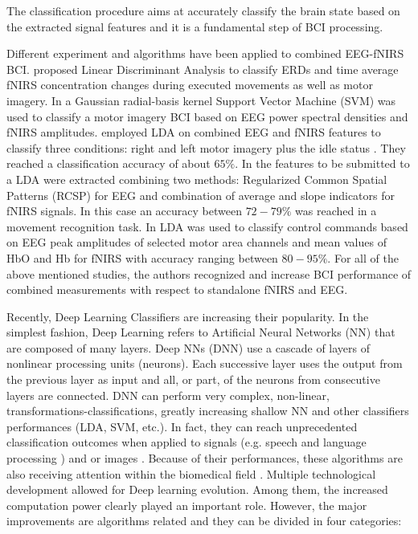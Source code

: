 \documentclass[12pt ]{iopart}
\begin{document}
The classification procedure aims at accurately classify the brain state  based on the extracted signal features  and it is a fundamental step of BCI processing.


Different  experiment and algorithms have been applied  to combined EEG-fNIRS BCI.  \textcite{Fazli_2012} proposed Linear Discriminant Analysis to classify ERDs and time average fNIRS concentration changes during executed movements as well as motor imagery.  In \textcite{ma2012hybrid} a Gaussian radial-basis kernel Support Vector Machine (SVM) was used to classify a motor imagery BCI based on EEG power spectral densities and fNIRS amplitudes.   \textcite{lee2014hybrid} employed LDA on combined EEG and fNIRS features to classify three conditions: right and left motor imagery plus the idle status . They reached a classification accuracy of about $65\%$. In \textcite{buccino2016hybrid} the features to be submitted to a LDA were extracted combining two methods: Regularized Common Spatial Patterns (RCSP) for EEG and combination of average and slope indicators for fNIRS signals. In this case an accuracy between $72-79\%$ was reached in a movement recognition task. In  \textcite{khan2014decoding, khan2017hybrid} LDA was used to classify control commands based on EEG peak amplitudes of selected motor area channels and mean values of HbO and Hb for fNIRS with accuracy ranging between $80-95\%$.
For all of the above mentioned studies, the authors recognized and increase BCI performance of combined measurements with respect to standalone fNIRS and EEG.

Recently, Deep Learning Classifiers are increasing their popularity. In the simplest fashion, Deep Learning  refers to Artificial Neural Networks (NN) \parencite{lecun2015deep, schmidhuber2015deep} that are composed of many layers. Deep NNs (DNN) use a cascade of  layers of nonlinear processing units (neurons). Each successive layer uses the output from the previous layer as input and all, or part, of the neurons from consecutive layers are connected. DNN can perform very complex, non-linear, transformations-classifications, greatly increasing shallow NN  \parencite{bianchini2014complexity}  and other classifiers performances (LDA, SVM, etc.). In fact, they can reach unprecedented classification outcomes when applied to signals (e.g. speech and language processing ) and or images \parencite{simonyan2014very, hinton2012deep, collobert2008unified, krizhevsky2012imagenet}. Because of their performances, these algorithms are also receiving  attention within the biomedical field \parencite{ronneberger2015u, hudson2000neural, ciresan2012deep}. 
Multiple technological development allowed for Deep learning evolution. 
Among them, the increased computation power clearly played an important role.
However, the major improvements are algorithms related and they can be divided in four  categories:
\end{document}
